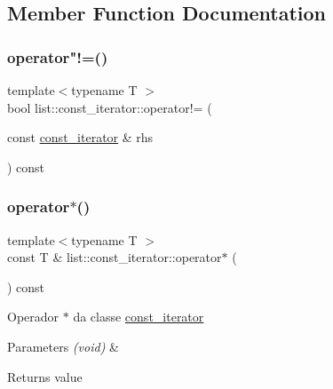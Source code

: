 \subsection{Member Function Documentation}
\mbox{\label{classsc_1_1list_1_1const__iterator_a2d271dbabdc3d2e47d1642a5e7beb84d}} 
\subsubsection{\texorpdfstring{operator"!=()}{operator!=()}}
{\footnotesize\ttfamily template$<$typename T $>$ \\
bool list\+::const\+\_\+iterator\+::operator!= (\begin{DoxyParamCaption}\item[{const \mbox{\hyperlink{classsc_1_1list_1_1const__iterator}{const\+\_\+iterator}} \&}]{rhs }\end{DoxyParamCaption}) const}

\mbox{\label{classsc_1_1list_1_1const__iterator_a24261f681d1a805b5c50a59b3242c0f2}} 
\subsubsection{\texorpdfstring{operator$\ast$()}{operator*()}}
{\footnotesize\ttfamily template$<$typename T $>$ \\
const T \& list\+::const\+\_\+iterator\+::operator$\ast$ (\begin{DoxyParamCaption}{ }\end{DoxyParamCaption}) const}

Operador $\ast$ da classe \mbox{\hyperlink{classsc_1_1list_1_1const__iterator}{const\+\_\+iterator}} 
\begin{DoxyParams}{Parameters}
{\em (void)} & \\
\hline
\end{DoxyParams}
\begin{DoxyReturn}{Returns}
value 
\end{DoxyReturn}
\mbox{\label{classsc_1_1list_1_1const__iterator_abc6d5da99e4c689c662a0037b0bc9013}} 
